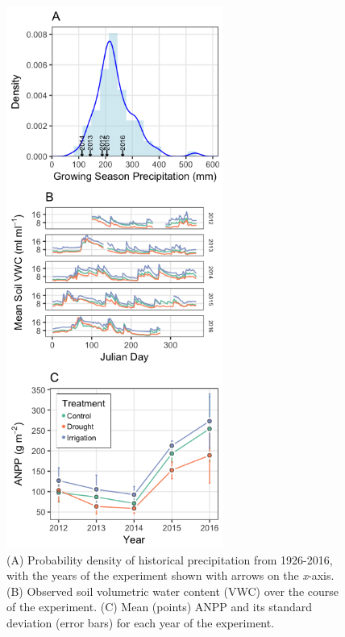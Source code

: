 \documentclass[fleqn,10pt,lineno]{wlpeerj} %
\begin{document}
\newpage{}

\begin{figure}[!ht]
  \centering
      \includegraphics[height=7in]{../figures/Figure1.png}
  \caption{(A) Probability density of historical precipitation from 1926-2016, with the years of the experiment shown with arrows on the \emph{x}-axis. (B) Observed soil volumetric water content (VWC) over the course of the experiment. (C) Mean (points) ANPP and its standard deviation (error bars) for each year of the experiment.}
\end{figure}

\newpage{}
\end{document}
